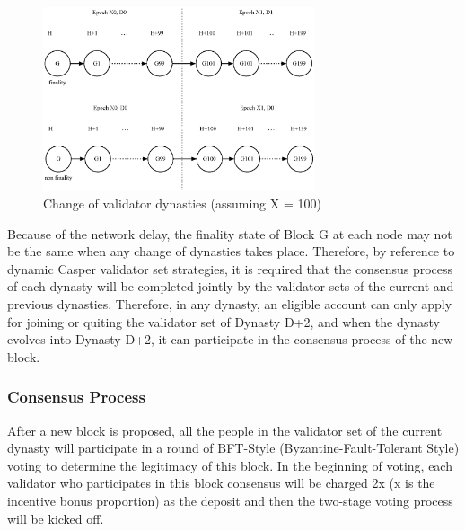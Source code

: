 
\begin{figure}[h]
\centering
\includegraphics[width=8cm]{./figs/epoch}
\caption{Change of validator dynasties (assuming X = 100)}
\label{fig:epoch}
\end{figure}

Because of the network delay, the finality state of Block G at each node may not be the same when any change of dynasties takes place. Therefore, by reference to dynamic Casper validator set strategies, it is required that the consensus process of each dynasty will be completed jointly by the validator sets of the current and previous dynasties. Therefore, in any dynasty, an eligible account can only apply for joining or quiting the validator set of Dynasty D+2, and when the dynasty evolves into Dynasty D+2, it can participate in the consensus process of the new block.


\subsubsection{Consensus Process}
\label{pod:design:consensus}

After a new block is proposed, all the people in the validator set of the current dynasty will participate in a round of BFT-Style (Byzantine-Fault-Tolerant Style) voting to determine the legitimacy of this block. In the beginning of voting, each validator who participates in this block consensus will be charged 2x (x is the incentive bonus proportion) as the deposit and then the two-stage voting process will be kicked off.

